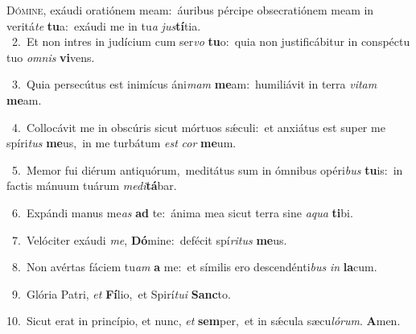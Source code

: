 \lettrine{\initial\textcolor{\initialcolor}{D}}{ómine,} exáudi oratiónem meam:~\dagger áuribus pércipe obsecratiónem meam in veritá\textit{te} \textbf{tu}\-a:~\star exáudi me in tu\textit{a} \textit{jus}\-\textbf{tí}tia.\\
{\numbfont\textcolor{\numbcolor}{~2.}}~Et non intres in judícium cum ser\textit{vo} \textbf{tu}\-o:~\star quia non justificábitur in conspéctu tuo \textit{om}\-\textit{nis} \textbf{vi}\-vens.\par
{\numbfont\textcolor{\numbcolor}{~3.}}~Quia persecútus est inimícus áni\textit{mam} \textbf{me}\-am:~\star humiliávit in terra \textit{vi}\-\textit{tam} \textbf{me}\-am.\par
{\numbfont\textcolor{\numbcolor}{~4.}}~Collocávit me in obscúris sicut mórtuos sǽculi:~\dagger et anxiátus est super me spíri\textit{tus} \textbf{me}\-us,~\star in me turbátum \textit{est} \textit{cor} \textbf{me}\-um.\par
{\numbfont\textcolor{\numbcolor}{~5.}}~Memor fui diérum antiquórum,~\dagger meditátus sum in ómnibus opéri\textit{bus} \textbf{tu}\-is:~\star in factis mánuum tuárum \textit{me}\-\textit{di}\textbf{tá}bar.\par
{\numbfont\textcolor{\numbcolor}{~6.}}~Expándi manus me\textit{as} \textbf{ad} te:~\star ánima mea sicut terra sine \textit{a}\-\textit{qua} \textbf{ti}\-bi.\par
{\numbfont\textcolor{\numbcolor}{~7.}}~Velóciter exáudi \textit{me}\-, \textbf{Dó}\-mine:~\star defécit spí\-\textit{ri}\-\textit{tus} \textbf{me}\-us.\par
{\numbfont\textcolor{\numbcolor}{~8.}}~Non avértas fáciem tu\textit{am} \textbf{a} me:~\star et símilis ero descendénti\textit{bus} \textit{in} \textbf{la}\-cum.\par
{\numbfont\textcolor{\numbcolor}{~9.}}~Glória Patri, \textit{et} \textbf{Fí}\-lio,~\star et Spirí\-\textit{tu}\-\textit{i} \textbf{Sanc}\-to.\par
{\numbfont\textcolor{\numbcolor}{10.}}~Sicut erat in princípio, et nunc, \textit{et} \textbf{sem}\-per,~\star et in sǽcula sæcu\-\textit{ló}\-\textit{rum}. \textbf{A}\-men.\par
